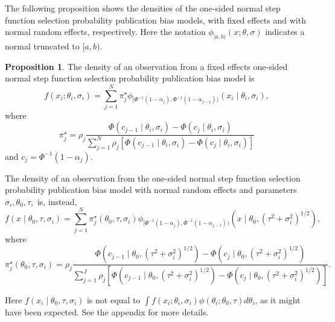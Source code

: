 \documentclass{article}
\theoremstyle{plain}
\theoremstyle{definition}
\newtheorem{prop}[theorem]{Proposition}
\renewcommand{\sqrt}[1]{(#1)^{1/2}}
\begin{document}
The following proposition shows the densities of the one-sided normal step function selection probability publication bias models, with fixed effects and with normal random effects, respectively. Here the notation $\phi_{[a,b)}(x;\theta,\sigma)$ indicates a normal truncated to $[a,b)$.
\begin{prop}
\label{prop:One-sided normal discrete probability vector publication bias model-1}
The density of an observation from a fixed effects one-sided normal step function selection probability publication bias model is
\begin{equation}\label{eq:Fixed effects, publication bias}
f(x_{i};\theta_{i},\sigma_{i}) = \sum_{j=1}^{N}\pi_{j}^\star\phi_{[\Phi^{-1}(1-\alpha_{j}),\Phi^{-1}(1-\alpha_{j-1}))}(x_{i}\mid\theta_{i},\sigma_{i}),
\end{equation}
where
$$
\pi_{j}^{\star}=\rho_{j}\frac{\Phi(c_{j-1}\mid\theta_{i},\sigma_{i})-\Phi(c_{j}\mid\theta_{i},\sigma_{i})}{\sum_{j=1}^{N}\rho_{j}\left[\Phi(c_{j-1}\mid\theta_{i},\sigma_{i})-\Phi(c_{j}\mid\theta_{i},\sigma_{i})\right]}
$$
and $c_{j}=\Phi^{-1}(1-\alpha_{j})$.

The density of an observation from the one-sided normal step function selection probability publication bias model with normal random effects and parameters $\sigma_{i},\theta_{0},\tau,$ is, instead,
\begin{equation}\label{eq:Random effects, publication bias}
f(x\mid\theta_{0},\tau,\sigma_{i})=\sum_{j=1}^{N}\pi_{j}^{\star}(\theta_0,\tau,\sigma_{i})\phi_{[\Phi^{-1}(1-\alpha_{j}),\Phi^{-1}(1-\alpha_{j-1}))}(x\mid\theta_{0},\sqrt{\tau^{2}+\sigma_{i}^{2}}),
\end{equation}
where 
\[
\pi_{j}^{\star}(\theta_0,\tau,\sigma_{i})=\rho_{j}\frac{\Phi(c_{j-1}\mid\theta_{0},\sqrt{\tau^{2}+\sigma_{i}^{2}})-\Phi(c_{j}\mid\theta_{0},\sqrt{\tau^{2}+\sigma_{i}^{2}})}{\sum_{j=1}^{J}\rho_{j}\left[\Phi(c_{j-1}\mid\theta_{0},\sqrt{\tau^{2}+\sigma_{i}^{2}})-\Phi(c_{j}\mid\theta_{0},\sqrt{\tau^{2}+\sigma_{i}^{2}})\right]}.
\]
\end{prop}

Here $f(x_i\mid\theta_{0},\tau,\sigma_i)$ is not equal to $\int f(x_{i};\theta_{i},\sigma_{i})\phi(\theta_{i};\theta_{0},\tau)d\theta_{i}$,
as it might have been expected. See the appendix for more details.
\end{document}
